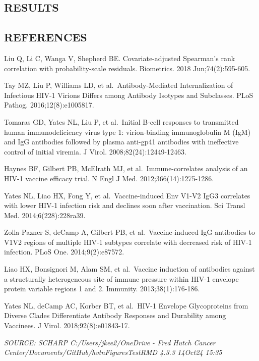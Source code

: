 \documentclass[12pt]{article}
\newcommand{\tlfgeo}{\newgeometry{margin=0.25in, top=0in, includeheadfoot}}
\newcommand{\tlf}{%
  \tlfgeo
  \pagestyle{tlfpage}
}
\begin{document}
\hypertarget{results}{%
\subsection{RESULTS}\label{results}}

\hypertarget{references}{%
\subsection{REFERENCES}\label{references}}

Liu Q, Li C, Wanga V, Shepherd BE. Covariate-adjusted Spearman's rank
correlation with probability-scale residuals. Biometrics. 2018
Jun;74(2):595-605.

Tay MZ, Liu P, Williams LD, et al.~Antibody-Mediated Internalization of
Infectious HIV-1 Virions Differs among Antibody Isotypes and Subclasses.
PLoS Pathog. 2016;12(8):e1005817.

Tomaras GD, Yates NL, Liu P, et al.~Initial B-cell responses to
transmitted human immunodeficiency virus type 1: virion-binding
immunoglobulin M (IgM) and IgG antibodies followed by plasma anti-gp41
antibodies with ineffective control of initial viremia. J Virol.
2008;82(24):12449-12463.

Haynes BF, Gilbert PB, McElrath MJ, et al.~Immune-correlates analysis of
an HIV-1 vaccine efficacy trial. N Engl J Med. 2012;366(14):1275-1286.

Yates NL, Liao HX, Fong Y, et al.~Vaccine-induced Env V1-V2 IgG3
correlates with lower HIV-1 infection risk and declines soon after
vaccination. Sci Transl Med. 2014;6(228):228ra39.

Zolla-Pazner S, deCamp A, Gilbert PB, et al.~Vaccine-induced IgG
antibodies to V1V2 regions of multiple HIV-1 subtypes correlate with
decreased risk of HIV-1 infection. PLoS One. 2014;9(2):e87572.

Liao HX, Bonsignori M, Alam SM, et al.~Vaccine induction of antibodies
against a structurally heterogeneous site of immune pressure within
HIV-1 envelope protein variable regions 1 and 2. Immunity.
2013;38(1):176-186.

Yates NL, deCamp AC, Korber BT, et al.~HIV-1 Envelope Glycoproteins from
Diverse Clades Differentiate Antibody Responses and Durability among
Vaccinees. J Virol. 2018;92(8):e01843-17.

\emph{SOURCE: SCHARP C:/Users/jkee2/OneDrive - Fred Hutch Cancer
Center/Documents/GitHub/hvtnFiguresTestRMD 4.3.3 14Oct24 15:35}

\tlf
\end{document}
